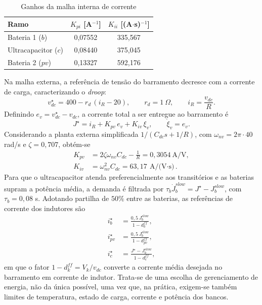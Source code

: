 \begin{table}[H]
\centering
\caption{Ganhos da malha interna de corrente}
\label{tab:ganhos}
\small
\begin{tabular}{lcc}
\toprule
Ramo & $K_{pi}$ [A$^{-1}$] & $K_{ii}$ [(A$\cdot$s)$^{-1}$] \\
\midrule
Bateria 1 ($b$) & 0,07552 & 335,567 \\
Ultracapacitor ($c$) & 0,08440 & 375,045 \\
Bateria 2 ($pv$) & 0,13327 & 592,176 \\
\bottomrule
\end{tabular}
\end{table}

Na malha externa, a referência de tensão do barramento decresce com a corrente de carga, caracterizando o \textit{droop}:
\begin{equation}
v_{dc}^{\star}=400-r_d\,(i_R-20),\qquad r_d=1\ \Omega,\qquad i_R=\frac{v_{dc}}{R}.
\end{equation}
Definindo $e_v=v_{dc}^{\star}-v_{dc}$, a corrente total a ser entregue ao barramento é
\begin{equation}
J^{\star}=i_R+K_{pv}\,e_v+K_{iv}\,\xi_v,\qquad\dot\xi_v=e_v.
\end{equation}
Considerando a planta externa simplificada $1/(C_{dc}s+1/R)$, com $\omega_{nv}=2\pi\cdot40$ rad/s e $\zeta=0{,}707$, obtém-se
\begin{align}
K_{pv}&=2\zeta\omega_{nv}C_{dc}-\frac1R=0{,}3054\ \text{A/V},\\
K_{iv}&=\omega_{nv}^2C_{dc}=63{,}17\ \text{A/(V$\cdot$s)}.
\end{align}
Para que o ultracapacitor atenda preferencialmente aos transitórios e as baterias supram a potência média, a demanda é filtrada por $\tau_b\dot J_b^{slow}=J^{\star}-J_b^{slow}$, com $\tau_b=0{,}08$ s. Adotando partilha de $50\%$ entre as baterias, as referências de corrente dos indutores são
\begin{align}
i_b^{\star}&=\frac{0{,}5\,J_b^{slow}}{1-d_b^{ff}},\nonumber\\
i_{pv}^{\star}&=\frac{0{,}5\,J_b^{slow}}{1-d_{pv}^{ff}},\label{eq:refs}\\
i_c^{\star}&=\frac{J^{\star}-J_b^{slow}}{1-d_c^{ff}},\nonumber
\end{align}
em que o fator $1-d_k^{ff}=V_k/v_{dc}$ converte a corrente média desejada no barramento em corrente de indutor. Trata-se de uma escolha de gerenciamento de energia, não da única possível, uma vez que, na prática, exigem-se também limites de temperatura, estado de carga, corrente e potência dos bancos.